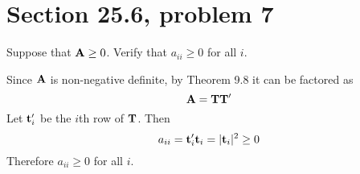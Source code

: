 \section{Section 25.6, problem 7}
Suppose that ${\bf A}\ge 0$. Verify that $a_{ii}\ge0$ for all $i$.

\bigskip
\noindent
Since $\bf A$ is non-negative definite,
by Theorem 9.8 it can be factored as
$${\bf A}={\bf T}{\bf T}'$$
Let ${\bf t}_i'$ be the $i$th row of $\bf T$.
Then
$$a_{ii}={\bf t}_i'{\bf t}_i=|{\bf t}_i|^2\ge0$$
Therefore $a_{ii}\ge0$ for all $i$.
